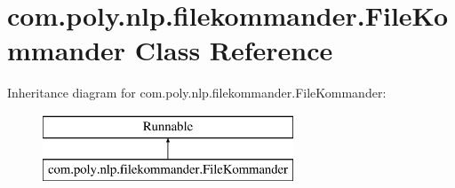 \hypertarget{classcom_1_1poly_1_1nlp_1_1filekommander_1_1_file_kommander}{\section{com.\-poly.\-nlp.\-filekommander.\-File\-Kommander Class Reference}
\label{classcom_1_1poly_1_1nlp_1_1filekommander_1_1_file_kommander}
}
Inheritance diagram for com.\-poly.\-nlp.\-filekommander.\-File\-Kommander\-:\begin{figure}[H]
\begin{center}
\leavevmode
\includegraphics[height=2.000000cm]{classcom_1_1poly_1_1nlp_1_1filekommander_1_1_file_kommander}
\end{center}
\end{figure}
